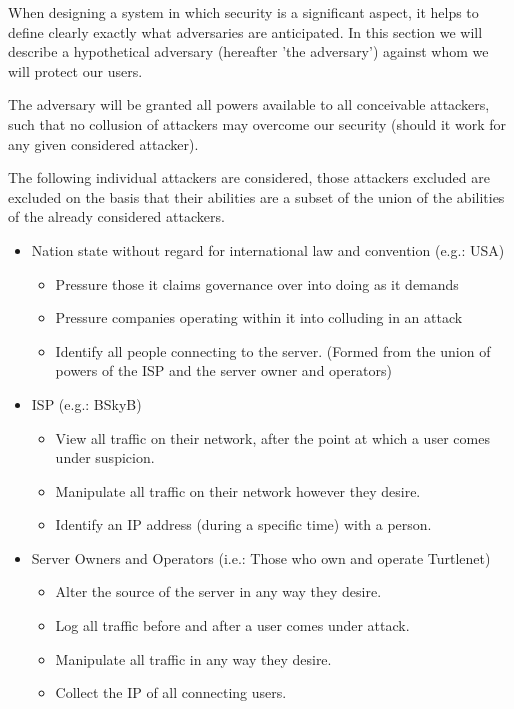 When designing a system in which security is a significant aspect, it helps to
define clearly exactly what adversaries are anticipated. In this section we will
describe a hypothetical adversary (hereafter 'the adversary') against whom we
will protect our users.

The adversary will be granted all powers available to all conceivable attackers,
such that no collusion of attackers may overcome our security (should it work
for any given considered attacker).

The following individual attackers are considered, those attackers excluded are
excluded on the basis that their abilities are a subset of the union of the
abilities of the already considered attackers.

\begin{itemize}
    \item Nation state without regard for international law and convention (e.g.: USA)
        \begin{itemize}
            \item Pressure those it claims governance over into doing as it
                  demands
            \item Pressure companies operating within it into colluding in an
                  attack
            \item Identify all people connecting to the server. (Formed from the
                  union of powers of the ISP and the server owner and operators)
        \end{itemize}
    \item ISP (e.g.: BSkyB)
        \begin{itemize}
            \item View all traffic on their network, after the point at which a
                  user comes under suspicion.
            \item Manipulate all traffic on their network however they desire.
            \item Identify an IP address (during a specific time) with a person.
        \end{itemize}
    \item Server Owners and Operators (i.e.: Those who own and operate Turtlenet)
        \begin{itemize}
            \item Alter the source of the server in any way they desire.
            \item Log all traffic before and after a user comes under attack.
            \item Manipulate all traffic in any way they desire.
            \item Collect the IP of all connecting users.
        \end{itemize}
\end{itemize}


